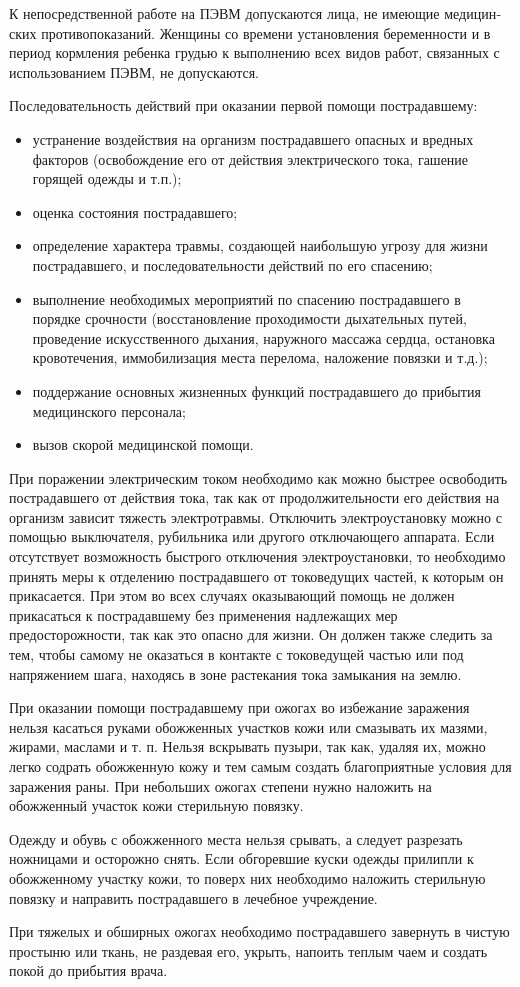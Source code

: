 К непосредственной работе на ПЭВМ допускаются лица, не имеющие медицин­ских противопоказаний. 
Женщины со времени установления беременности и в период кормления ре­бенка грудью к выполнению 
всех видов работ, связанных с использованием ПЭВМ, не допускаются.

Последовательность действий при оказании первой помощи пострадавшему:
\begin{itemize}
 \item устранение воздействия на организм пострадавшего опасных и вредных факторов 
(освобождение его от действия электрического тока, гашение горящей одежды и т.п.);
 \item оценка состояния пострадавшего;
 \item определение характера травмы, создающей наибольшую угрозу для жизни пострадавшего, 
и последовательности действий по его спасению;
 \item выполнение необходимых мероприятий по спасению пострадавшего в порядке срочности 
(восстановление проходимости дыхательных путей, проведение искусственного дыхания, 
наружного массажа сердца, остановка кровотечения, иммобилизация места перелома, наложение повязки и т.д.);
 \item поддержание основных жизненных функций пострадавшего до прибытия медицинского персонала;
 \item вызов скорой медицинской помощи.
\end{itemize}

При поражении электрическим током необходимо как можно быстрее освободить пострадавшего от 
действия тока, так как от продолжительности его действия на организм зависит тяжесть электротравмы. 
Отключить электроустановку можно с помощью выключателя, рубильника или другого отключающего аппарата.
Если отсутствует возможность быстрого отключения электроустановки, то необходимо принять меры к 
отделению пострадавшего от токоведущих частей, к которым он прикасается. 
При этом во всех случаях оказывающий помощь не должен прикасаться к пострадавшему без применения 
надлежащих мер предосторожности, так как это опасно для жизни. Он должен также следить за тем, 
чтобы самому не оказаться в контакте с токоведущей частью или под напряжением шага, 
находясь в зоне растекания тока замыкания на землю.

При оказании помощи пострадавшему при ожогах во избежание заражения нельзя касаться руками 
обожженных участков кожи или смазывать их мазями, жирами, маслами и т. п.
Нельзя вскрывать пузыри, так как, удаляя их, можно легко содрать обожженную кожу и тем самым 
создать благоприятные условия для заражения раны.
При небольших ожогах степени нужно наложить на обожженный участок кожи стерильную повязку.

Одежду и обувь с обожженного места нельзя срывать, а следует разрезать ножницами и осторожно снять. 
Если обгоревшие куски одежды прилипли к обожженному участку кожи, то поверх них необходимо наложить 
стерильную повязку и направить пострадавшего в лечебное учреждение.

При тяжелых и обширных ожогах необходимо пострадавшего завернуть в чистую простыню или ткань, 
не раздевая его, укрыть, напоить теплым чаем и создать покой до прибытия врача.